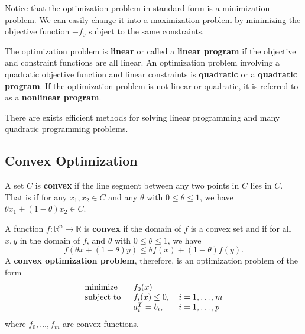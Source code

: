 Notice that the optimization problem in standard form is a minimization problem.  We can easily change it into a maximization problem by minimizing the objective function $-f_0$ subject to the same constraints.

The optimization problem is {\color{tiananmen}\textbf{linear}} or called a {\color{tiananmen}\textbf{linear program}} if the objective and constraint functions are all linear. An optimization problem involving a quadratic objective function and linear constraints is {\color{tiananmen}\textbf{quadratic}} or a {\color{tiananmen}\textbf{quadratic program}}. If the optimization problem is not linear or quadratic, it is referred to as a {\color{tiananmen}\textbf{nonlinear program}}.

There are exists efficient methods for solving linear programming and many quadratic programming problems.

\subsection{Convex Optimization}

A set {\color{baystate}$C$} is {\color{tiananmen}\textbf{convex}} if the line segment between any two points in $C$ lies in $C$. That is {\color{baystate}if for any $x_1,x_2\in C$ and any $\theta$ with $0\leq\theta\leq 1$, we have $\theta x_1+(1-\theta)x_2\in C$}.

A function {\color{baystate}$f : \mathbb{R}^n\rightarrow\mathbb{R}$} is {\color{tiananmen}\textbf{convex}} if the domain of $f$ is a convex set and if for all $x,y$ in the domain of $f$, and $\theta$ with $0\leq\theta\leq 1$, we have
{\color{baystate}
	\begin{equation}
		f\left(\theta x+\left(1-\theta\right)y\right)\leq\theta f(x)+(1-\theta)f(y).
		\label{Convexity}
	\end{equation}
}
A {\color{tiananmen} \textbf{convex optimization problem}}, therefore, is an optimization problem of the form
{\color{baystate}
	\begin{equation}
		\begin{tabular}{lll}
			\text{minimize }   & $f_0(x)$          & \\
			\text{subject to } & $f_i(x)\leq 0$, & $i=1,\ldots, m$\\
			& $a_i^T = b_i$,      & $i=1,\ldots, p$
		\end{tabular}\label{ConvexOptimization}
	\end{equation}
	where $f_0,\ldots,f_m$ are convex functions.
}

